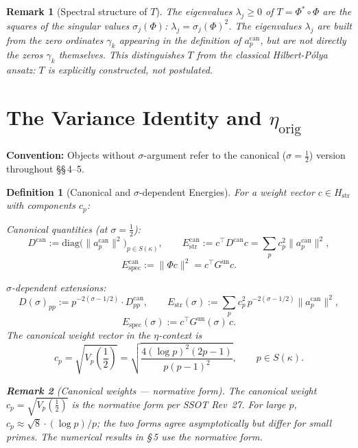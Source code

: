 \documentclass[11pt]{article}
\newtheorem{definition}[theorem]{Definition}
\newtheorem*{remark}{Remark}
\newcommand{\Hstr}{H_{\mathrm{str}}}
\newcommand{\Estr}{E_{\mathrm{str}}}
\newcommand{\Espec}{E_{\mathrm{spec}}}
\newcommand{\etaorig}{\eta_{\mathrm{orig}}}
\newcommand{\Gun}{G^{\mathrm{un}}}
\newcommand{\acan}{a_p^{\mathrm{can}}}
\newcommand{\Dcan}{D^{\mathrm{can}}}
\newcommand{\Estrcan}{\Estr^{\mathrm{can}}}
\newcommand{\Especcan}{\Espec^{\mathrm{can}}}
\begin{document}
\begin{remark}[Spectral structure of $T$]
The eigenvalues $\lambda_j\geq 0$ of $T=\Phi^*\circ\Phi$ are the squares of
the singular values $\sigma_j(\Phi)$: $\lambda_j=\sigma_j(\Phi)^2$.
The eigenvalues $\lambda_j$ are built from the zero ordinates $\gamma_k$
appearing in the definition of $\acan$, but are \emph{not} directly the zeros
$\gamma_k$ themselves. This distinguishes $T$ from the classical Hilbert-P\'olya
ansatz: $T$ is explicitly constructed, not postulated.
\end{remark}

\section{The Variance Identity and $\etaorig$}

\textbf{Convention:} Objects without $\sigma$-argument refer to the canonical
($\sigma=\tfrac12$) version throughout \S\S\,4--5.

\begin{definition}[Canonical and $\sigma$-dependent Energies]
\label{def:energies}
For a weight vector $c\in\Hstr$ with components $c_p$:

\emph{Canonical quantities} (at $\sigma=\tfrac12$):
\[
\Dcan:=\mathrm{diag}\!\bigl(\|\acan\|^2\bigr)_{p\in S(\kappa)},
\qquad
\Estrcan:=c^\top\Dcan c=\sum_p c_p^2\|\acan\|^2,
\]
\[
\Especcan:=\|\Phi c\|^2=c^\top\Gun c.
\]

\emph{$\sigma$-dependent extensions:}
\[
D(\sigma)_{pp}:=p^{-2(\sigma-1/2)}\cdot\Dcan_{pp},
\qquad
\Estr(\sigma):=\sum_p c_p^2\,p^{-2(\sigma-1/2)}\|\acan\|^2,
\]
\[
\Espec(\sigma):=c^\top\Gun(\sigma)\,c.
\]
The \emph{canonical weight vector} in the $\eta$-context is
\[
c_p = \sqrt{V_p({\textstyle\frac12})}
    = \sqrt{\frac{4(\log p)^2(2p-1)}{p(p-1)^2}},
    \qquad p \in S(\kappa).
\]
\begin{remark}[Canonical weights --- normative form]
The canonical weight $c_p = \sqrt{V_p(\frac{1}{2})}$
is the normative form per SSOT Rev~27. For large $p$,
$c_p \approx \sqrt{8}\cdot(\log p)/p$; the two forms
agree asymptotically but differ for small primes.
The numerical results in \S\,5 use the normative form.
\end{remark}
\end{definition}
\end{document}
